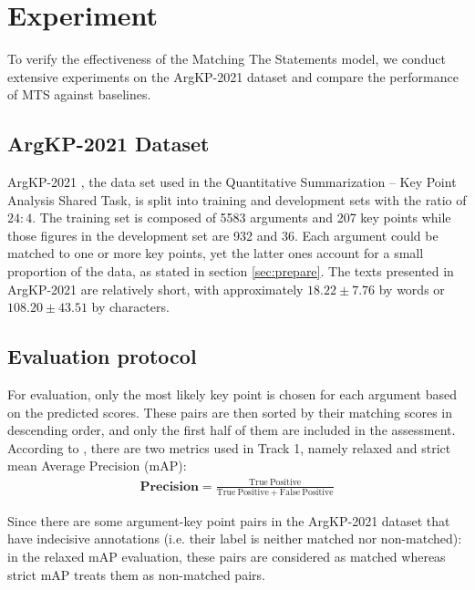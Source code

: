 \section{Experiment}
\label{sec:experiment}


To verify the effectiveness of the Matching The Statements model, we conduct extensive experiments on the ArgKP-2021 \citep{bar-haim-etal-2020-arguments} dataset and compare the performance of MTS against baselines. 

\subsection{ArgKP-2021 Dataset}

ArgKP-2021 \citep{bar-haim-etal-2020-arguments}, the data set used in the Quantitative Summarization – Key Point Analysis Shared Task, is split into training and development sets with the ratio of $24:4$. The training set is composed of 5583 arguments and 207 key points while those figures in the development set are 932 and 36. Each argument could be matched to one or more key points, yet the latter ones account for a small proportion of the data, as stated in section \ref{sec:prepare}. The texts presented in ArgKP-2021 are relatively short, with approximately $18.22 \pm 7.76$ by words or $108.20 \pm 43.51$ by characters.

\subsection{Evaluation protocol}

For evaluation, only the most likely key point is chosen for each argument based on the predicted scores. These pairs are then sorted by their matching scores in descending order, and only the first half of them are included in the assessment. According to \citet{kpa-2021-overview}, there are two metrics used in Track 1, namely relaxed and strict mean Average Precision (mAP):
\begin{align*}
\mathbf{Precision} = \frac{\mathrm{True\:Positive}}
{\mathrm{True\:Positive} + \mathrm{False\:Positive}}
\end{align*}

Since there are some argument-key point pairs in the ArgKP-2021 dataset that have indecisive annotations (i.e. their label is neither matched nor non-matched): in the relaxed mAP evaluation, these pairs are considered as matched whereas strict mAP treats them as non-matched pairs.

